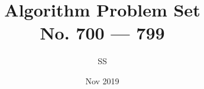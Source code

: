 \documentclass[a4paper,12pt]{article}
\title{Algorithm Problem Set \\ \large No. 700 --- 799}
\author{SS}
\date{Nov 2019}
\begin{document}
\renewcommand{\thelstlisting}{\thesection.\arabic{lstlisting}}
\newcommand{\fcc}[1]{\lstinline[language=C++, basicstyle=\small\ttfamily, keywordstyle=\bfseries\color{green!40!black}]|#1|}
\newcommand{\fcj}[1]{\lstinline[language=Java, basicstyle=\small\ttfamily, keywordstyle=\bfseries\color{green!40!black}]|#1|}
\maketitle




%






% 
% 
% 
% 
% 
% 
% 
% 
% 
% 
% 
% 
% 
% 
% 
% 
% 
% 
% 
% 
% 
% 
% 
% 
% 
% 
% 
% 
% 
% 
% 
% 
% 
% 
% 
% 
% 
% 
% 
% 
% 
% 
% 
% 
% 
% 
% 
% 
% 
% 
% 
% 
% 
% 
% 
% 
% 
% 
% 
% 
% 
% 
% 
% 
% 
% 
% 
% 
% 
% 
% 
% 
% 
% 
% 
% 
% 
% 
% 
% 
% 
% 
% 
% 
% 
% 
% 
% 
% 


\end{document}
